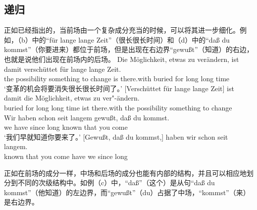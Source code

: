 \subsection{递归}
\label{sec-topo-rekursion}
正如\citet[]{Reis80a}已经指出的，当前场由一个复杂成分充当的时候，可以将其进一步细化。例如，（b）中的“für lange lange Zeit”（很长很长时间）和（d）中的“daß du kommst”（你要进来）都位于前场，但是出现在右边界“gewußt”（知道）的右边，也就是说他们出现在前场内的后场。
\eal
\label{Beispiel-topologisch-komplexes-Vorfeld}
\ex
\gll Die Möglichkeit, etwas zu verändern, ist damit verschüttet für lange lange Zeit.\\
	 the possibility something to change is there.with buried for long long time\\
\glt `变革的机会将要消失很长很长时间了。'	  
\ex 
\gll {}[Verschüttet für lange lange Zeit] ist damit die Möglichkeit,      etwas zu ver"-ändern.\\
      \spacebr{}buried for long long time ist there.with the possibility  something to change\\
\ex 
\gll Wir haben schon seit langem gewußt, daß du kommst.\\
     we have \particle{} since long known that you come\\
\glt `我们早就知道你要来了。'
\ex 
\gll {}[Gewußt, daß du kommst,] haben wir schon seit langem.\\
	 \spacebr{}known that you come have we \particle{} since long\\
\zl


\noindent
正如在前场的成分一样，中场和后场的成分也能有内部的结构，并且可以相应地划分到不同的次级结构中。如例（c）中，“daß”（这个）是从句“daß du kommst”（他知道）的左边界，而“gewußt”（du）占据了中场，“kommst”（来）是右边界。


